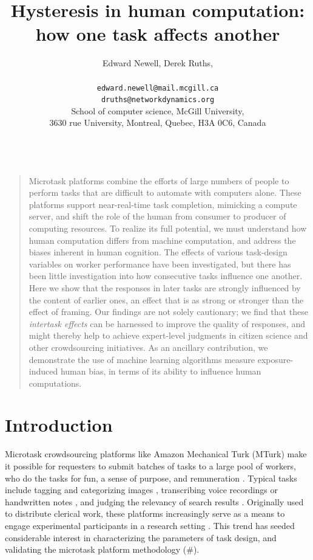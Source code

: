 \documentclass[12pt]{article}
\title{Hysteresis in human computation:\\ how one task affects another}
\author
{Edward Newell, Derek Ruths,\\
\\
\normalsize{\texttt{edward.newell@mail.mcgill.ca}}\\
\normalsize{\texttt{druths@networkdynamics.org}}\\
\normalsize{School of computer science, McGill University,}\\
\normalsize{3630 rue University, Montreal, Quebec, H3A 0C6, Canada}\\
\\
}
\date{}
\newenvironment{sciabstract}{%
\begin{quote} \bf}
{\end{quote}}
\begin{document}
 


\baselineskip24pt


\maketitle 




\begin{sciabstract}

Microtask platforms combine the efforts of large numbers 
of people to perform tasks that are difficult to automate with computers 
alone.  These platforms support near-real-time task completion, mimicking a
compute server, and shift the role of the human from consumer to 
producer of computing resources.  To realize its full
potential, we must understand how human computation differs from machine 
computation, and address the biases inherent in 
human cognition.  The effects of various task-design variables on worker
performance have been investigated, but there has been little 
investigation into how consecutive tasks influence one another. Here we show 
that the responses in later tasks are strongly influenced by the content of 
earlier ones, an effect that is as strong or stronger than the effect of 
framing.  Our findings are not solely cautionary; we find
that these \textit{intertask effects} can be harnessed to improve the quality 
of responses, and might thereby help to achieve expert-level judgments in 
citizen science and other crowdsourcing initiatives. 
As an ancillary contribution, we demonstrate the use of machine learning 
algorithms measure exposure-induced human bias, in terms of its ability to 
influence human computations. 
\end{sciabstract}

\section*{Introduction}
Microtask crowdsourcing platforms like Amazon Mechanical Turk (MTurk) make it 
possible for requesters to submit batches of tasks to a large pool of 
workers, who do the tasks for fun, a sense of purpose, and remuneration 
\cite{kazai2013analysis,Antin20122925}.  
Typical tasks include tagging and categorizing images 
\cite{6116320,Zhai2012357}, transcribing voice recordings 
\cite{chandler2013breaking,paolacci2010running}
or handwritten notes \cite{Berinsky2012351,Finnerty2013}, and judging the 
relevancy of search results 
\cite{le2010ensuring,grady2010crowdsourcing,alonso2009can,kazai2013analysis}.
Originally used to distribute clerical work, these platforms 
increasingly serve as a means to engage experimental participants in a 
research 
setting \cite{paolacci2010running,Berinsky2012351,snow2008cheap,alonso2009can}.
This trend has seeded considerable interest in characterizing the parameters
of task design, and validating the microtask platform methodology (\#).
\end{document}
